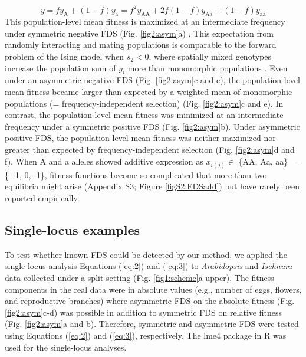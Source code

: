 \documentclass[12pt,]{article}
\begin{document}
\begin{equation}
\bar{y} = f y_\mathrm{A} + (1-f)y_\mathrm{a} = f^2 y_\mathrm{AA} + 2f (1-f)y_\mathrm{Aa} + (1-f)y_\mathrm{aa} \label{eq:6}
\end{equation}
\noindent
This population-level mean fitness is maximized at an intermediate frequency under symmetric negative FDS (Fig. \ref{fig2:asym}a) \citep{schneider_maximization_2008}. This expectation from randomly interacting and mating populations is comparable to the forward problem of the Ising model when $s_2<0$, where spatially mixed genotypes increase the population sum of $y_i$ more than monomorphic populations \citep{sato2019neighbor}. Even under an asymmetric negative FDS (Fig. \ref{fig2:asym}c and e), the population-level mean fitness became larger than expected by a weighted mean of monomorphic populations (= frequency-independent selection) \citep{takahashi2018balanced} (Fig. \ref{fig2:asym}c and e). In contrast, the population-level mean fitness was minimized at an intermediate frequency under a symmetric positive FDS (Fig. \ref{fig2:asym}b). Under asymmetric positive FDS, the population-level mean fitness was neither maximized nor greater than expected by frequency-independent selection \citep{schneider_maximization_2008, takahashi2018balanced} (Fig. \ref{fig2:asym}d and f). When A and a alleles showed additive expression as $x_{i(j)} \in$ \{AA, Aa, aa\} $=$ \{+1, 0, -1\}, fitness functions become so complicated that more than two equilibria might arise (Appendix S3; Figure \ref{figS2:FDSadd}) but have rarely been reported empirically. 


\subsection{Single-locus examples}
To test whether known FDS could be detected by our method, we applied the single-locus analysis Equations (\ref{eq:2}) and (\ref{eq:3}) to \textit{Arabidopsis} and \textit{Ischnura} data \citep{sato2017herbivore, takahashi2014evolution} collected under a split setting (Fig. \ref{fig1:scheme}a upper). The fitness components in the real data were in absolute values (e.g., number of eggs, flowers, and reproductive branches) where asymmetric FDS on the absolute fitness (Fig. \ref{fig2:asym}c-d) was possible in addition to symmetric FDS on relative fitness (Fig. \ref{fig2:asym}a and b). Therefore, symmetric and asymmetric FDS were tested using Equations (\ref{eq:2}) and (\ref{eq:3}), respectively. The lme4 package \citep{bates2015} in R was used for the single-locus analyses.
\end{document}
